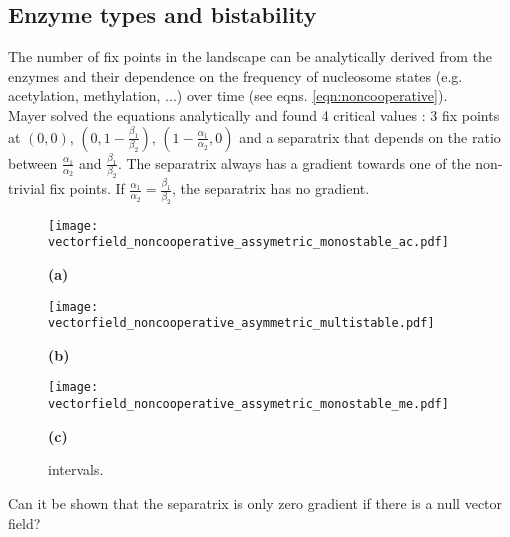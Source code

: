         \subsection{Enzyme types and bistability}
            The number of fix points in the landscape can be analytically derived from the enzymes and their dependence on the frequency of nucleosome states (e.g. acetylation, methylation, ...) over time (see eqns. \ref{eqn:noncooperative}).\\
            Mayer solved the equations analytically and found 4 critical values \cite{mayer2020langevin}: 3 fix points at $(0,0)$, $(0,1-\frac{\beta_1}{\beta_2})$, $(1-\frac{\alpha_1}{\alpha_2},0)$ and a separatrix that depends on the ratio between $\frac{\alpha_1}{\alpha_2}$ and $\frac{\beta_1}{\beta_2}$. The separatrix always has a gradient towards one of the non-trivial fix points. If $\frac{\alpha_1}{\alpha_2} = \frac{\beta_1}{\beta_2}$, the separatrix has no gradient.\\
            \begin{figure}[ht!] %
                \centering
                \begin{minipage}{0.3\textwidth}
                    \texttt{[image: vectorfield\_noncooperative\_assymetric\_monostable\_ac.pdf]}
                    \caption*{\small \textbf{(a)}}
                    \label{}
                \end{minipage}
                \begin{minipage}{0.3\textwidth}
                    \texttt{[image: vectorfield\_noncooperative\_asymmetric\_multistable.pdf]}
                    \caption*{\small \textbf{(b)}}
                    \label{}
                \end{minipage}
                 \begin{minipage}{0.3\textwidth}
                    \texttt{[image: vectorfield\_noncooperative\_assymetric\_monostable\_me.pdf]}
                    \caption*{\small \textbf{(c)}}
                    \label{}
                \end{minipage}
               \caption{\small  intervals.}
            \end{figure}
            \begin{itemize}
                {
                    \color{red}
                    \item Can it be shown that the separatrix is only zero gradient if there is a null vector field?
                }
            \end{itemize} %
